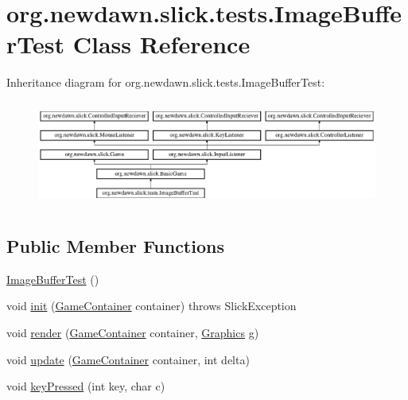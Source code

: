 \hypertarget{classorg_1_1newdawn_1_1slick_1_1tests_1_1_image_buffer_test}{}\section{org.\+newdawn.\+slick.\+tests.\+Image\+Buffer\+Test Class Reference}
\label{classorg_1_1newdawn_1_1slick_1_1tests_1_1_image_buffer_test}
Inheritance diagram for org.\+newdawn.\+slick.\+tests.\+Image\+Buffer\+Test\+:\begin{figure}[H]
\begin{center}
\leavevmode
\includegraphics[height=3.522012cm]{classorg_1_1newdawn_1_1slick_1_1tests_1_1_image_buffer_test}
\end{center}
\end{figure}
\subsection*{Public Member Functions}
\begin{DoxyCompactItemize}
\item 
\mbox{\hyperlink{classorg_1_1newdawn_1_1slick_1_1tests_1_1_image_buffer_test_a7de8d41dc4225e5ebbebf56f60f8990a}{Image\+Buffer\+Test}} ()
\item 
void \mbox{\hyperlink{classorg_1_1newdawn_1_1slick_1_1tests_1_1_image_buffer_test_a3fef5aad2f8b60fd274af7d974f9583a}{init}} (\mbox{\hyperlink{classorg_1_1newdawn_1_1slick_1_1_game_container}{Game\+Container}} container)  throws Slick\+Exception 
\item 
void \mbox{\hyperlink{classorg_1_1newdawn_1_1slick_1_1tests_1_1_image_buffer_test_af45d248a46ad54a7c7afb91e6b0f8d1b}{render}} (\mbox{\hyperlink{classorg_1_1newdawn_1_1slick_1_1_game_container}{Game\+Container}} container, \mbox{\hyperlink{classorg_1_1newdawn_1_1slick_1_1_graphics}{Graphics}} g)
\item 
void \mbox{\hyperlink{classorg_1_1newdawn_1_1slick_1_1tests_1_1_image_buffer_test_a05c50b58b7ebc8202f95ae6735eca2b9}{update}} (\mbox{\hyperlink{classorg_1_1newdawn_1_1slick_1_1_game_container}{Game\+Container}} container, int delta)
\item 
void \mbox{\hyperlink{classorg_1_1newdawn_1_1slick_1_1tests_1_1_image_buffer_test_afd3aca2a853b70ccf8154376865bc287}{key\+Pressed}} (int key, char c)
\end{DoxyCompactItemize}
